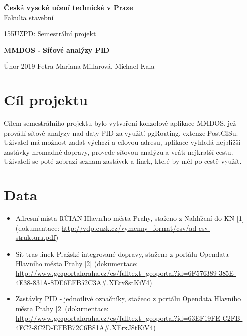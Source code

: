 \documentclass[a4paper, 12pt]{article}
\begin{document}
\begin{titlepage}
\begin{center}
\noindent
\Large \textbf{České vysoké učení technické v Praze }\\ Fakulta stavební
\vspace{5cm}

\Large


\vspace{4cm}

155UZPD: Semestrální projekt \\
\Huge

\textbf{MMDOS - Síťové analýzy PID}
\vspace{11cm}

\large
Únor 2019 \hspace{5cm} Petra Mariana Millarová, Michael Kala\\

\end{center}

\end{titlepage}




\pagestyle{plain}     %
\setcounter{page}{1}  %


\section{Cíl projektu}
Cílem semestrálního projektu bylo vytvoření konzolové aplikace MMDOS, jež provádí síťové analýzy nad daty PID za využití pgRouting, extenze PostGISu. Uživatel má možnost zadat výchozí a cílovou adresu, aplikace vyhledá nejbližší zastávky hromadné dopravy, provede síťovou analýzu a vrátí nejkratší cestu. Uživateli se poté zobrazí seznam zastávek a linek, které by měl po cestě využít.

\newpage
\section{Data}
\begin{itemize}
	\item Adresní místa RÚIAN Hlavního města Prahy, staženo z Nahlížení do KN [1] (dokumentace: \url{http://vdp.cuzk.cz/vymenny_format/csv/ad-csv-struktura.pdf})
	\item Síť tras linek Pražské integrované dopravy, staženo z portálu Opendata Hlavního města Prahy [2] (dokumentace: \url{http://www.geoportalpraha.cz/cs/fulltext_geoportal?id=6F576389-385E-4E38-831A-8DE6EFB52C3A#.XErv8stKiV4})
	\item Zastávky PID - jednotlivé označníky, staženo z portálu Opendata Hlavního města Prahy [2] (dokumentace: \url{http://www.geoportalpraha.cz/cs/fulltext_geoportal?id=63EF19FE-C2FB-4FC2-8C2D-EEBB72C6B81A#.XErxJ8tKiV4})
\end{itemize}
\end{document}
